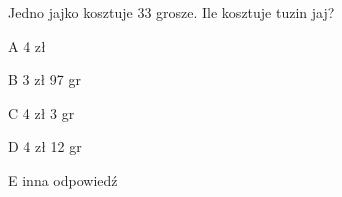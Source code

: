 \begin{tresc}
Jedno jajko kosztuje 33 grosze. Ile kosztuje tuzin jaj?
\end{tresc}
\begin{wariant}{A} 4 zł \end{wariant}
\begin{wariant}{B} 3 zł 97 gr \end{wariant}
\begin{wariant}{C} 4 zł 3 gr \end{wariant}
\begin{wariant}{D} 4 zł 12 gr \end{wariant}
\begin{wariant}{E} inna odpowiedź \end{wariant}
